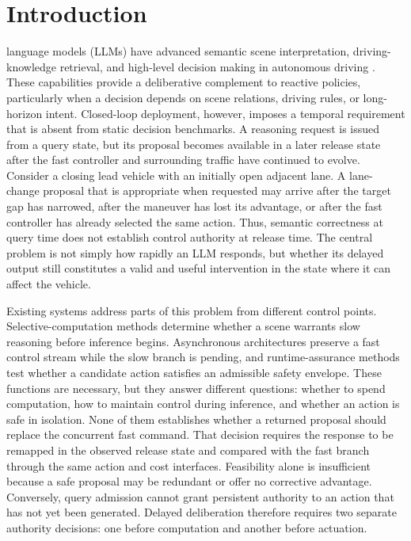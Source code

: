 \documentclass[letterpaper,journal]{IEEEtran}
\begin{document}
\section{Introduction}
\label{sec:introduction}
 language models (LLMs) have advanced semantic scene
interpretation, driving-knowledge retrieval, and high-level decision making
in autonomous driving
\cite{wen2024dilu,chen2024drivingllms,mao2023gptdriver,tvtDrivingKnowledge2026}.
These capabilities provide a deliberative complement to reactive policies,
particularly when a decision depends on scene relations, driving rules, or
long-horizon intent. Closed-loop deployment, however, imposes a temporal
requirement that is absent from static decision benchmarks. A reasoning request
is issued from a query state, but its proposal becomes available in a later
release state after the fast controller and surrounding traffic have continued
to evolve. Consider a closing lead vehicle with an initially open adjacent
lane. A lane-change proposal that is appropriate when requested may arrive
after the target gap has narrowed, after the maneuver has lost its advantage,
or after the fast controller has already selected the same action. Thus,
semantic correctness at query time does not establish control authority at
release time. The central problem is not simply how rapidly an LLM responds,
but whether its delayed output still constitutes a valid and useful
intervention in the state where it can affect the vehicle.

Existing systems address parts of this problem from different control points.
Selective-computation methods determine whether a scene warrants slow
reasoning before inference begins. Asynchronous architectures preserve a fast
control stream while the slow branch is pending, and runtime-assurance methods
test whether a candidate action satisfies an admissible safety envelope. These
functions are necessary, but they answer different questions: whether to spend
computation, how to maintain control during inference, and whether an action is
safe in isolation. None of them establishes whether a returned proposal should
replace the concurrent fast command. That decision requires the response to be
remapped in the observed release state and compared with the fast branch
through the same action and cost interfaces. Feasibility alone is insufficient
because a safe proposal may be redundant or offer no corrective advantage.
Conversely, query admission cannot grant persistent authority to an action that
has not yet been generated. Delayed deliberation therefore requires two
separate authority decisions: one before computation and another before
actuation.
\end{document}
